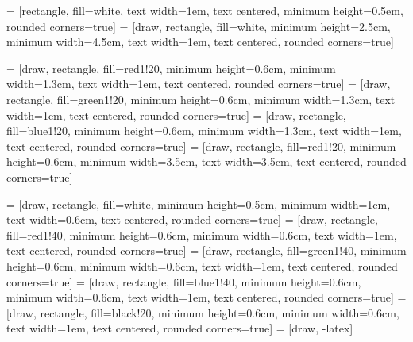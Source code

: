  = [rectangle, fill=white, text width=1em, text centered, minimum height=0.5em, rounded corners=true]
 = [draw, rectangle, fill=white, minimum height=2.5cm, minimum width=4.5cm, text width=1em, text centered, rounded corners=true]

 = [draw, rectangle, fill=red1!20, minimum height=0.6cm, minimum width=1.3cm, text width=1em, text centered, rounded corners=true]
 = [draw, rectangle, fill=green1!20, minimum height=0.6cm, minimum width=1.3cm, text width=1em, text centered, rounded corners=true]
 = [draw, rectangle, fill=blue1!20, minimum height=0.6cm, minimum width=1.3cm, text width=1em, text centered, rounded corners=true]
 = [draw, rectangle, fill=red1!20, minimum height=0.6cm, minimum width=3.5cm, text width=3.5cm, text centered, rounded corners=true]

 = [draw, rectangle, fill=white, minimum height=0.5cm, minimum width=1cm, text width=0.6cm, text centered, rounded corners=true]
 = [draw, rectangle, fill=red1!40, minimum height=0.6cm, minimum width=0.6cm, text width=1em, text centered, rounded corners=true]
 = [draw, rectangle, fill=green1!40, minimum height=0.6cm, minimum width=0.6cm, text width=1em, text centered, rounded corners=true]
 = [draw, rectangle, fill=blue1!40, minimum height=0.6cm, minimum width=0.6cm, text width=1em, text centered, rounded corners=true]
 = [draw, rectangle, fill=black!20, minimum height=0.6cm, minimum width=0.6cm, text width=1em, text centered, rounded corners=true]
 = [draw, -latex]



